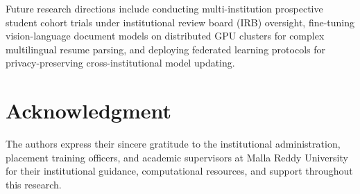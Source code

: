 \documentclass[conference]{IEEEtran}
\begin{document}
Future research directions include conducting multi-institution prospective student cohort trials under institutional review board (IRB) oversight, fine-tuning vision-language document models on distributed GPU clusters for complex multilingual resume parsing, and deploying federated learning protocols for privacy-preserving cross-institutional model updating.

\section*{Acknowledgment}

The authors express their sincere gratitude to the institutional administration, placement training officers, and academic supervisors at Malla Reddy University for their institutional guidance, computational resources, and support throughout this research.
\end{document}
